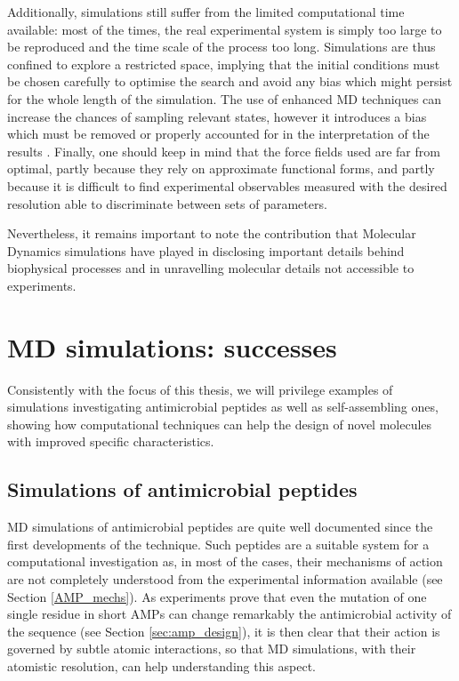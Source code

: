 Additionally, simulations still suffer from the limited computational time available: most of the times, the real experimental system is simply too large to be reproduced and the time scale of the process too long. Simulations are thus confined to explore a restricted space, implying that the initial conditions must be chosen carefully to optimise the search and avoid any bias which might persist for the whole length of the simulation. The use of enhanced MD techniques can increase the chances of sampling relevant states, however it introduces a bias which must be removed or properly accounted for in the interpretation of the results \citep{Bernardi2015,Best2005,Barducci2010,Barducci2011,Mills2008}.
Finally, one should keep in mind that the force fields used are far from optimal, partly because they rely on approximate functional forms, and partly because it is difficult to find experimental observables measured with the desired resolution able to discriminate between sets of parameters.

Nevertheless, it remains important to note the contribution that Molecular Dynamics simulations have played in disclosing important details behind biophysical processes and in unravelling molecular details not accessible to experiments.


\section{MD simulations: successes} \label{sec:md_lit}
Consistently with the focus of this thesis, we will privilege examples of simulations investigating antimicrobial peptides as well as self-assembling ones, showing how computational techniques can help the design of novel molecules with improved specific characteristics.

\subsection{Simulations of antimicrobial peptides}
MD simulations of antimicrobial peptides are quite well documented since the first developments of the technique. Such peptides are a suitable system for a computational investigation as, in most of the cases, their mechanisms of action are not completely understood from the experimental information available (see Section \ref{AMP_mechs}). As experiments prove that even the mutation of one single residue in short AMPs can change remarkably the antimicrobial activity of the sequence (see Section \ref{sec:amp_design}), it is then clear that their action is governed by subtle atomic interactions, so that MD simulations, with their atomistic resolution, can help understanding this aspect.


